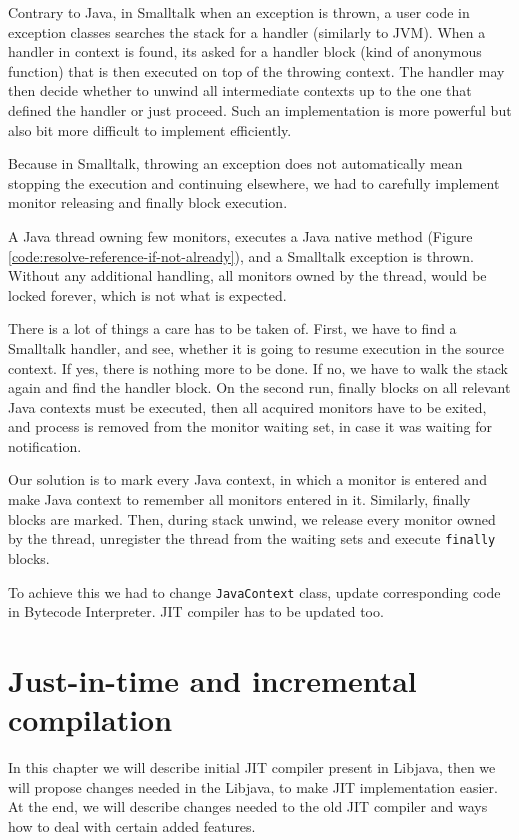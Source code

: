 \documentclass[11pt,twoside,a4paper]{book}
\let\Chapter\chapter
\def\chapter{\addtocontents{lol}{\protect\addvspace{10pt}}\Chapter}
\newcommand{\libjava}{{Libjava}}
\begin{document}
Contrary to Java, in Smalltalk when an exception is thrown, a user code in exception classes searches the stack for 
a handler (similarly to JVM). When a handler in context is found, its asked for a handler block (kind of anonymous function) that is then executed on top of the throwing context. 
The handler may then decide whether to unwind all intermediate contexts up to the one that defined the handler or just proceed. 
Such an implementation is more powerful but also bit more difficult to implement efficiently. 

Because in Smalltalk, throwing an exception does not automatically mean stopping the execution and continuing elsewhere, we had to carefully implement monitor releasing and finally block execution.

A Java thread owning few monitors, executes a Java native method (Figure \ref{code:resolve-reference-if-not-already}), and a Smalltalk exception is thrown.
Without any additional handling, all monitors owned by the thread, would be locked forever, which is not what is expected.

There is a lot of things a care has to be taken of. 
First, we have to find a Smalltalk handler, and see, whether it is going to resume execution in the source context. 
If yes, there is nothing more to be done.
If no, we have to walk the stack again and find the handler block. On the second run, finally blocks on all relevant Java contexts must be executed, then all acquired monitors have to be exited, and process is removed from the monitor waiting set, in case it was waiting for notification.

Our solution is to mark every Java context, in which a monitor is entered and make Java context to remember all monitors entered in it.
Similarly, finally blocks are marked.
Then, during stack unwind, we release every monitor owned by the thread, unregister the thread from the waiting sets and execute \texttt{finally} blocks.

To achieve this we had to change \texttt{JavaContext} class, update corresponding code in Bytecode Interpreter.
JIT compiler has to be updated too.

\chapter{Just-in-time and incremental compilation}
\label{chap:jit}

In this chapter we will describe initial JIT compiler present in \libjava{}, then we will propose changes needed in the \libjava{}, to make JIT implementation easier.
At the end, we will describe changes needed to the old JIT compiler and ways how to deal with certain added features.
\end{document}
